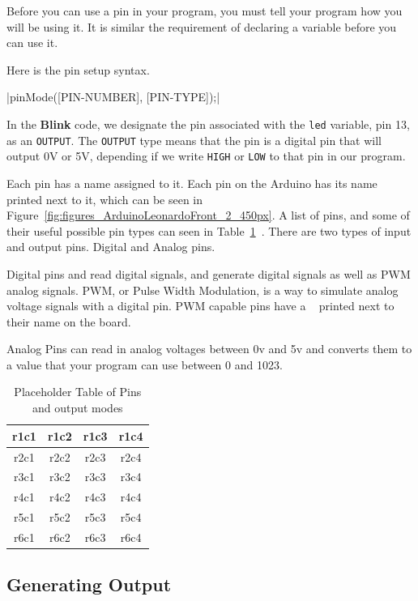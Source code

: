 \documentclass[11pt,a4paper]{article}
\begin{document}
Before you can use a pin in your program, you must tell your program how you will be using it.  It is similar the requirement of declaring a variable before you can use it.  

Here is the pin setup syntax.

|pinMode([PIN-NUMBER], [PIN-TYPE]);|

In the \textbf{Blink} code, we designate the pin associated with the \texttt{led} variable, pin 13, as an \texttt{OUTPUT}.  The \texttt{OUTPUT} type means that the pin is a digital pin that will output 0V or 5V, depending if we write \texttt{HIGH} or \texttt{LOW} to that pin in our program.

Each pin has a name assigned to it.  Each pin on the Arduino has its name printed next to it, which can be seen in Figure~\ref{fig:figures_ArduinoLeonardoFront_2_450px}.  A list of pins, and some of their useful possible pin types can seen in Table~\ref{tab:pintypes}~.  There are two types of input and output pins.  Digital and Analog pins.

Digital pins and read digital signals, and generate digital signals as well as PWM analog signals.  PWM, or Pulse Width Modulation, is a way to simulate analog voltage signals with a digital pin.  PWM capable pins have a ~ printed next to their name on the board.

Analog Pins can read in analog voltages between 0v and 5v and converts them to a value that your program can use between 0 and 1023.

\begin{table}[hct!]
\caption{Placeholder Table of Pins and output modes}
\label{tab:pintypes}
\centering
\begin{tabular}{cc|cc}
\hline \hline 
r1c1 & r1c2 & r1c3 & r1c4\\
\hline
r2c1 & r2c2 & r2c3 & r2c4\\
\hline
r3c1 & r3c2 & r3c3 & r3c4\\
\hline
r4c1 & r4c2 & r4c3 & r4c4\\
\hline
r5c1 & r5c2 & r5c3 & r5c4\\
\hline
r6c1 & r6c2 & r6c3 & r6c4\\
\hline \hline 
\end{tabular}
\end{table}


\subsection{Generating Output} %
\label{sub:generating_output}
\end{document}
